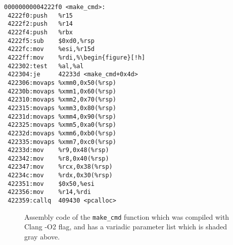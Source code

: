 \newsavebox{\firstlistingA}
\begin{lrbox}{\firstlistingA}
\begin{minipage}[c]{0.52\linewidth}
\begin{verbatim}
00000000004222f0 <make_cmd>:
 4222f0:push   %r15
 4222f2:push   %r14
 4222f4:push   %rbx
 4222f5:sub    $0xd0,%rsp
 4222fc:mov    %esi,%r15d
 4222ff:mov    %rdi,%\begin{figure}[!h]
 422302:test   %al,%al
 422304:je     42233d <make_cmd+0x4d>
 422306:movaps %xmm0,0x50(%rsp)
 42230b:movaps %xmm1,0x60(%rsp)
 422310:movaps %xmm2,0x70(%rsp)
 422315:movaps %xmm3,0x80(%rsp)
 42231d:movaps %xmm4,0x90(%rsp)
 422325:movaps %xmm5,0xa0(%rsp)
 42232d:movaps %xmm6,0xb0(%rsp)
 422335:movaps %xmm7,0xc0(%rsp)
 42233d:mov    %r9,0x48(%rsp)
 422342:mov    %r8,0x40(%rsp)
 422347:mov    %rcx,0x38(%rsp)
 42234c:mov    %rdx,0x30(%rsp)
 422351:mov    $0x50,%esi
 422356:mov    %r14,%rdi
 422359:callq  409430 <pcalloc>
\end{verbatim}
\end{minipage}
\end{lrbox}
\begin{figure}[H]
\centering
{\usebox{\firstlistingA}} 
\caption{Assembly code of the \texttt{make\_cmd} function which was compiled with Clang -O2 flag, and has a variadic parameter list which is shaded gray above.}
\label{fig:asmvariadic}
\end{figure}

